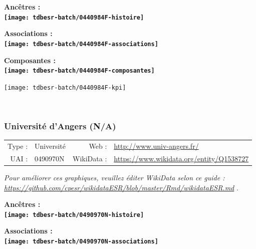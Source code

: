 \documentclass[12pt,french,]{article}
\begin{document}
\vspace{1cm}  
\begin{minipage}[b]{0.50\textwidth}\begin{center} \bf Ancêtres : \\  
\texttt{[image: tdbesr-batch/0440984F-histoire]} \end{center}\end{minipage}\begin{minipage}[b]{0.50\textwidth}\begin{center} \bf Associations : \\  
\texttt{[image: tdbesr-batch/0440984F-associations]} \end{center}\end{minipage}

\hrulefill

\begin{center} \bf Composantes : \\  
\texttt{[image: tdbesr-batch/0440984F-composantes]} \end{center}

\begin{center}\texttt{[image: tdbesr-batch/0440984F-kpi]} \end{center}\checkoddpage

\ifoddpage \fi ~\newpage  

\hypertarget{universituxe9-dangers-na}{%
\subsubsection{Université d'Angers
(N/A)}\label{universituxe9-dangers-na}}

\begin{tabular*}{\textwidth}{rp{5cm}rl}  
\hline  
Type : & Université & Web : &\href{http://www.univ-angers.fr/}{http://www.univ-angers.fr/} \\  
UAI : & 0490970N & WikiData : & \href{https://www.wikidata.org/entity/Q1538727}{https://www.wikidata.org/entity/Q1538727} \\  
\hline  
\end{tabular*}

\textit{\scriptsize Pour améliorer ces graphiques, veuillez éditer WikiData selon ce guide :  \href{https://github.com/cpesr/wikidataESR/blob/master/Rmd/wikidataESR.md}{https://github.com/cpesr/wikidataESR/blob/master/Rmd/wikidataESR.md}}
.

\vspace{1cm}  
\begin{minipage}[b]{0.50\textwidth}\begin{center} \bf Ancêtres : \\  
\texttt{[image: tdbesr-batch/0490970N-histoire]} \end{center}\end{minipage}\begin{minipage}[b]{0.50\textwidth}\begin{center} \bf Associations : \\  
\texttt{[image: tdbesr-batch/0490970N-associations]} \end{center}\end{minipage}
\end{document}
